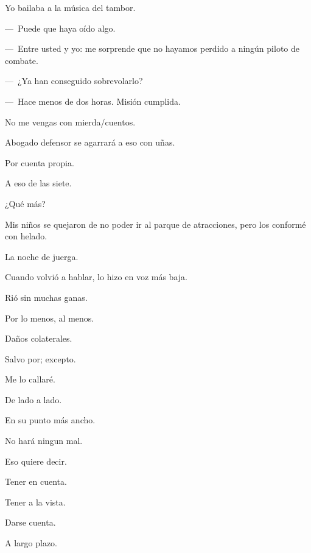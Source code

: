 \sk
Yo bailaba a la música del tambor. 

\sk
---~Puede que haya oído algo. 

\sk
---~Entre usted y yo: me sorprende que no hayamos perdido a ningún piloto de combate. 

\sk
---~¿Ya han conseguido sobrevolarlo? 

---~Hace menos de dos horas. Misión cumplida. 

\sk
No me vengas con mierda/cuentos. 

\sk
Abogado defensor se agarrará a eso con uñas. 

\sk
Por cuenta propia. 

\sk
A eso de las siete. 

\sk
¿Qué más? 

\sk
Mis niños se quejaron de no poder ir al parque de atracciones, pero los conformé con helado. 

\sk
La noche de juerga. 

\sk
Cuando volvió a hablar, lo hizo en voz más baja.

\sk
Rió sin muchas ganas.

\sk
Por lo menos, al menos. 

\sk
Daños colaterales. 

\sk
Salvo por; excepto. 

\sk
Me lo callaré. 

\sk
De lado a lado.

\sk
En su punto más ancho. 

\sk
No hará ningun mal. 


\sk
Eso quiere decir. 

\sk
Tener en cuenta. 

\sk
Tener a la vista. 

\sk
Darse cuenta. 

\sk
A largo plazo. 

